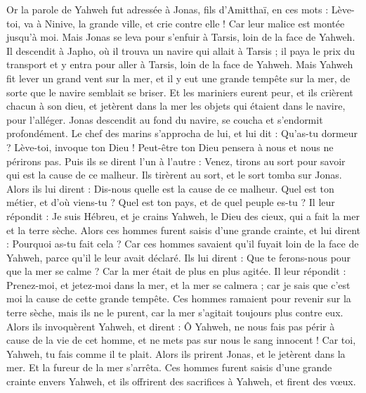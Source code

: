 \begin{multicols}{2}
\VerseOne{}Or la parole de Yahweh fut adressée à Jonas, fils d'Amitthaï, en ces mots :
Lève-toi, va à Ninive, la grande ville, et crie contre elle ! Car leur malice est montée jusqu'à moi.
Mais Jonas se leva pour s'enfuir à Tarsis, loin de la face de Yahweh. Il descendit à Japho, où il trouva un navire qui allait à Tarsis ; il paya le prix du transport et y entra pour aller à Tarsis, loin de la face de Yahweh.
Mais Yahweh fit lever un grand vent sur la mer, et il y eut une grande tempête sur la mer, de sorte que le navire semblait se briser.
Et les mariniers eurent peur, et ils crièrent chacun à son dieu, et jetèrent dans la mer les objets qui étaient dans le navire, pour l’alléger. Jonas descendit au fond du navire, se coucha et s’endormit profondément.
Le chef des marins s'approcha de lui, et lui dit : Qu’as-tu dormeur ? Lève-toi, invoque ton Dieu ! Peut-être ton Dieu pensera à nous et nous ne périrons pas.
Puis ils se dirent l'un à l'autre : Venez, tirons au sort pour savoir qui est la cause de ce malheur. Ils tirèrent au sort, et le sort tomba sur Jonas.
Alors ils lui dirent : Dis-nous quelle est la cause de ce malheur. Quel est ton métier, et d'où viens-tu ? Quel est ton pays, et de quel peuple es-tu ?
Il leur répondit : Je suis Hébreu, et je crains Yahweh, le Dieu des cieux, qui a fait la mer et la terre sèche.
Alors ces hommes furent saisis d'une grande crainte, et lui dirent : Pourquoi as-tu fait cela ? Car ces hommes savaient qu’il fuyait loin de la face de Yahweh, parce qu'il le leur avait déclaré.
Ils lui dirent : Que te ferons-nous pour que la mer se calme ? Car la mer était de plus en plus agitée.
Il leur répondit : Prenez-moi, et jetez-moi dans la mer, et la mer se calmera ; car je sais que c’est moi la cause de cette grande tempête.
Ces hommes ramaient pour revenir sur la terre sèche, mais ils ne le purent, car la mer s'agitait toujours plus contre eux.
Alors ils invoquèrent Yahweh, et dirent : Ô Yahweh, ne nous fais pas périr à cause de la vie de cet homme, et ne mets pas sur nous le sang innocent ! Car toi, Yahweh, tu fais comme il te plait.
Alors ils prirent Jonas, et le jetèrent dans la mer. Et la fureur de la mer s'arrêta.
Ces hommes furent saisis d’une grande crainte envers Yahweh, et ils offrirent des sacrifices à Yahweh, et firent des vœux.

\end{multicols}
